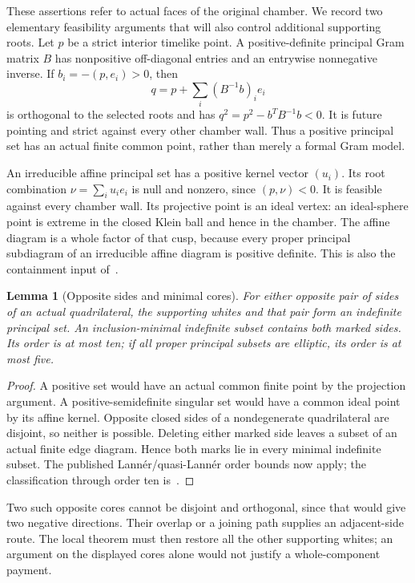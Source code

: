 \documentclass[11pt]{article}
\newtheorem{lemma}[theorem]{Lemma}
\theoremstyle{remark}\newtheorem{remark}[theorem]{Remark}
\begin{document}
These assertions refer to actual faces of the original chamber. We
record two elementary feasibility arguments that will also control
additional supporting roots. Let $p$ be a strict interior timelike
point. A positive-definite principal Gram matrix $B$ has nonpositive
off-diagonal entries and an entrywise nonnegative inverse. If
$b_i=-(p,e_i)>0$, then
\[
 q=p+\sum_i(B^{-1}b)_i e_i
\]
is orthogonal to the selected roots and has
$q^2=p^2-b^TB^{-1}b<0$. It is future pointing and strict against
every other chamber wall. Thus a positive principal set has an
actual finite common point, rather than merely a formal Gram model.

An irreducible affine principal set has a positive kernel vector
$(u_i)$. Its root combination $\nu=\sum_i u_i e_i$ is null and
nonzero, since $(p,\nu)<0$. It is feasible against every chamber
wall. Its projective point is an ideal vertex: an ideal-sphere point
is extreme in the closed Klein ball and hence in the chamber.
The affine diagram is a whole factor of that cusp, because every
proper principal subdiagram of an irreducible affine diagram is
positive definite. This is also the containment input
of~\cite[Section~1]{FeliksonTumarkin}.

\begin{lemma}[Opposite sides and minimal cores]\label{lem:opposite-cores}
For either opposite pair of sides of an actual quadrilateral, the
supporting whites and that pair form an indefinite principal set.
An inclusion-minimal indefinite subset contains both marked sides.
Its order is at most ten; if all proper principal subsets are
elliptic, its order is at most five.
\end{lemma}
\begin{proof}
A positive set would have an actual common finite point by the
projection argument. A positive-semidefinite singular set would
have a common ideal point by its affine kernel. Opposite closed
sides of a nondegenerate quadrilateral are disjoint, so neither is
possible. Deleting either marked side leaves a subset of an actual
finite edge diagram. Hence both marks lie in every minimal
indefinite subset. The published Lann\'er/quasi-Lann\'er order
bounds now apply; the classification through order ten
is~\cite{Chein}.
\end{proof}

Two such opposite cores cannot be disjoint and orthogonal, since
that would give two negative directions. Their overlap or a joining
path supplies an adjacent-side route. The local theorem must then
restore all the other supporting whites; an argument on the displayed
cores alone would not justify a whole-component payment.
\end{document}
